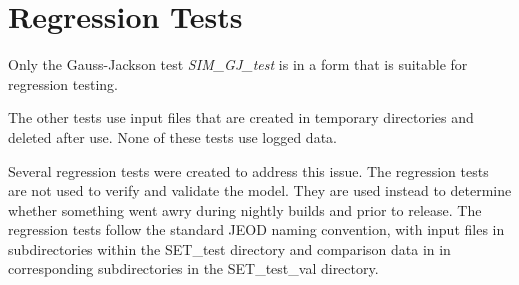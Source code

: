 \section{Regression Tests}
Only the Gauss-Jackson test \textit{SIM\_GJ\_test} is in a form that is 
suitable for regression testing.

The other tests use input files that are created in temporary directories
and deleted after use. None of these tests use logged data.

Several regression tests were created to address this issue. The
regression tests are not used to verify and validate the model.
They are used instead to determine whether something went awry
during nightly builds and prior to release. The regression tests
follow the standard JEOD naming convention, with input files in subdirectories
within the SET\_test directory and comparison data in in corresponding
subdirectories in the SET\_test\_val directory.
